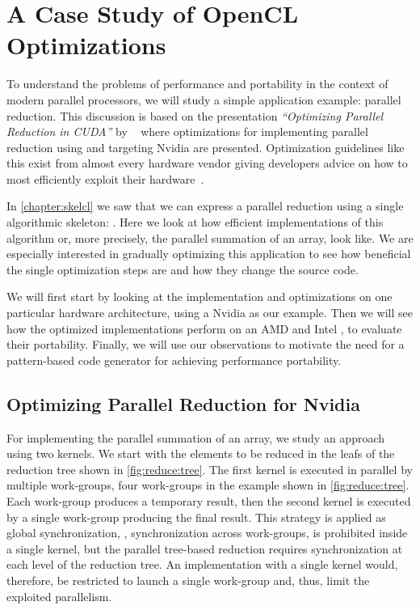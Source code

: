 \section{A Case Study of OpenCL Optimizations}
\label{sec:reduce:case-study}
\label{section:reduce:case-study}
To understand the problems of performance and portability in the context of modern parallel processors, we will study a simple application example: parallel reduction.
This discussion is based on the presentation \emph{``Optimizing Parallel Reduction in CUDA''} by \citeauthor{Harris2007}~\cite{Harris2007} where optimizations for implementing parallel reduction using \CUDA and targeting Nvidia \GPUs are presented.
Optimization guidelines like this exist from almost every hardware vendor giving developers advice on how to most efficiently exploit their hardware~\cite{CUDAProgrammingGuide,AMDProgrammingGuide,IntelGPUProgrammingGuide,IntelXeonProgrammingGuide}.

In \autoref{chapter:skelcl} we saw that we can express a parallel reduction using a single algorithmic skeleton: \reduce.
Here we look at how efficient \OpenCL implementations of this algorithm or, more precisely, the parallel summation of an array, look like.
We are especially interested in gradually optimizing this application to see how beneficial the single optimization steps are and how they change the source code.

We will first start by looking at the implementation and optimizations on one particular hardware architecture, using a Nvidia \GPU as our example.
Then we will see how the optimized implementations perform on an AMD \GPU and Intel \CPU, to evaluate their portability.
Finally, we will use our observations to motivate the need for a pattern-based code generator for achieving performance portability.

\subsection{Optimizing Parallel Reduction for Nvidia \GPUs}
For implementing the parallel summation of an array, we study an approach using two \OpenCL kernels.
We start with the elements to be reduced in the leafs of the reduction tree shown in \autoref{fig:reduce:tree}.
The first \OpenCL kernel is executed in parallel by multiple \OpenCL work-groups, four work-groups in the example shown in \autoref{fig:reduce:tree}.
Each work-group produces a temporary result, then the second \OpenCL kernel is executed by a single \OpenCL work-group producing the final result.
This strategy is applied as global synchronization, \ie, synchronization across work-groups, is prohibited inside a single \OpenCL kernel, but the parallel tree-based reduction requires synchronization at each level of the reduction tree.
An implementation with a single \OpenCL kernel would, therefore, be restricted to launch a single \OpenCL work-group and, thus, limit the exploited parallelism.

